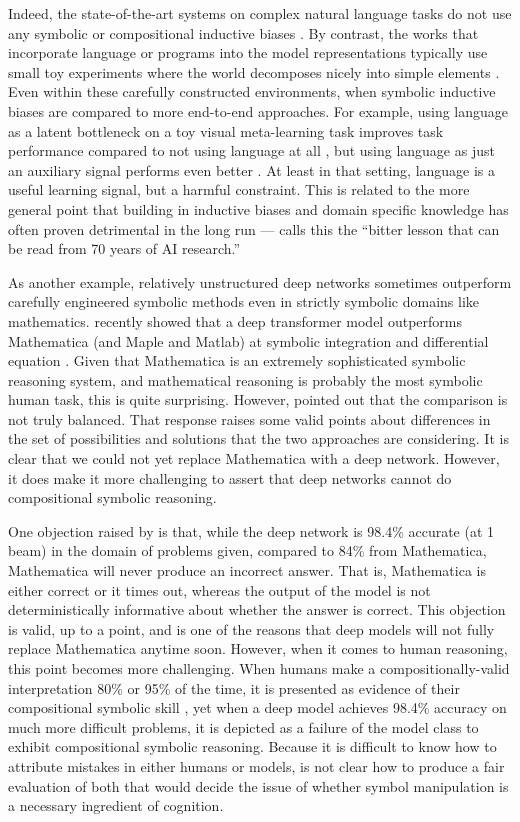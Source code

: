 Indeed, the state-of-the-art systems on complex natural language tasks do not use any symbolic or compositional inductive biases \citep[e.g.][]{Radford2019,Raffel2019}. By contrast, the works that incorporate language or programs into the model representations typically use small toy experiments where the world decomposes nicely into simple elements \citep{Andreas2017,Mao2019}. Even within these carefully constructed environments, when symbolic inductive biases are compared to more end-to-end approaches. For example, using language as a latent bottleneck on a toy visual meta-learning task improves task performance compared to not using language at all \citep{Andreas2017}, but using language as just an auxiliary signal performs even better \citep{Mu2019}. At least in that setting, language is a useful learning signal, but a harmful constraint. This is related to the more general point that building in inductive biases and domain specific knowledge has often proven detrimental in the long run --- \citet{Sutton2019} calls this the ``bitter lesson that can be read from 70 years of AI research.'' \par
As another example, relatively unstructured deep networks sometimes outperform carefully engineered symbolic methods even in strictly symbolic domains like mathematics. \citet{Lample2019} recently showed that a deep transformer model outperforms Mathematica (and Maple and Matlab) at symbolic integration and differential equation \citep{Lample2019}. Given that Mathematica is an extremely sophisticated symbolic reasoning system, and mathematical reasoning is probably the most symbolic human task, this is quite surprising. However, \citet{Davis2019} pointed out that the comparison is not truly balanced. That response raises some valid points about differences in the set of possibilities and solutions that the two approaches are considering. It is clear that we could not yet replace Mathematica with a deep network. However, it does make it more challenging to assert that deep networks cannot do compositional symbolic reasoning. \par
One objection raised by \citet{Davis2019} is that, while the deep network is 98.4\% accurate (at 1 beam) in the domain of problems given, compared to 84\% from Mathematica, Mathematica will never produce an incorrect answer. That is, Mathematica is either correct or it times out, whereas the output of the model is not deterministically informative about whether the answer is correct. This objection is valid, up to a point, and is one of the reasons that deep models will not fully replace Mathematica anytime soon. However, when it comes to human reasoning, this point becomes more challenging. When humans make a compositionally-valid interpretation 80\% or 95\% of the time, it is presented as evidence of their compositional symbolic skill \citep{Lake2019a}, yet when a deep model achieves 98.4\% accuracy on much more difficult problems, it is depicted as a failure of the model class to exhibit compositional symbolic reasoning. Because it is difficult to know how to attribute mistakes in either humans or models, is not clear how to produce a fair evaluation of both that would decide the issue of whether symbol manipulation is a necessary ingredient of cognition. \par 
